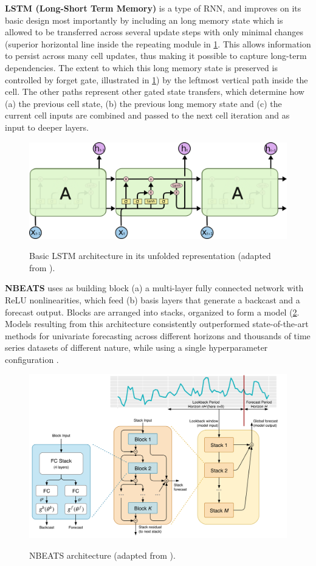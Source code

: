 \noindent
\textbf{LSTM (Long-Short Term Memory)} is a type of RNN, and improves on its basic design most importantly by including an long memory state which is allowed to be transferred across several update steps with only minimal changes (superior horizontal line inside the repeating module in \ref{fig:lstm}. This allows information to persist across many cell updates, thus making it possible to capture long-term dependencies. The extent to which this long memory state is preserved is controlled by forget gate, illustrated in \ref{fig:lstm}) by the leftmost vertical path inside the cell. The other paths represent other gated state transfers, which determine how (a) the previous cell state, (b) the previous long memory state and (c) the current cell inputs are combined and passed to the next cell iteration and as input to deeper layers.
\begin{figure}[H]
	\centering
    \caption{Basic LSTM architecture in its unfolded representation (adapted from \cite{paneru2015lstm}). }
    \includegraphics[scale=0.45]{lstm.png}
	\label{fig:lstm}
\end{figure}

\noindent
\textbf{NBEATS} uses as building block (a) a multi-layer fully connected network with ReLU nonlinearities, which feed (b) basis layers that generate a backcast and a forecast output. Blocks are arranged into stacks, organized to form a model (\ref{fig:nbeats}.  Models resulting from this architecture consistently outperformed state-of-the-art methods for univariate forecasting across different horizons and thousands of time series datasets of different nature, while using a single hyperparameter configuration \cite{oreshkin2019nbeats}.
\begin{figure}[H]
	\centering
    \caption{NBEATS architecture (adapted from \cite{oreshkin2019nbeats}).}
    \includegraphics[scale=0.3]{nbeats.png}
	\label{fig:nbeats}
\end{figure}


